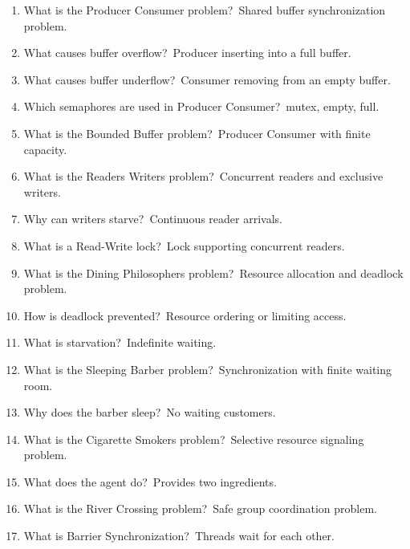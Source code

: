 \begin{enumerate}
\item What is the Producer Consumer problem?\
Shared buffer synchronization problem.

\item What causes buffer overflow?\
Producer inserting into a full buffer.

\item What causes buffer underflow?\
Consumer removing from an empty buffer.

\item Which semaphores are used in Producer Consumer?\
mutex, empty, full.

\item What is the Bounded Buffer problem?\
Producer Consumer with finite capacity.

\item What is the Readers Writers problem?\
Concurrent readers and exclusive writers.

\item Why can writers starve?\
Continuous reader arrivals.

\item What is a Read-Write lock?\
Lock supporting concurrent readers.

\item What is the Dining Philosophers problem?\
Resource allocation and deadlock problem.

\item How is deadlock prevented?\
Resource ordering or limiting access.

\item What is starvation?\
Indefinite waiting.

\item What is the Sleeping Barber problem?\
Synchronization with finite waiting room.

\item Why does the barber sleep?\
No waiting customers.

\item What is the Cigarette Smokers problem?\
Selective resource signaling problem.

\item What does the agent do?\
Provides two ingredients.

\item What is the River Crossing problem?\
Safe group coordination problem.

\item What is Barrier Synchronization?\
Threads wait for each other.


\end{enumerate}
